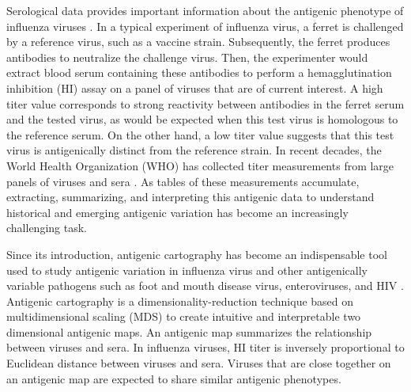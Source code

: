\documentclass[11pt,oneside,letterpaper]{article}
\begin{document}
Serological data provides important information about the antigenic phenotype of influenza viruses \cite{smith_mapping_2004}. 
In a typical experiment of influenza virus, a ferret is challenged by a reference virus, such as a vaccine strain.
Subsequently, the ferret produces antibodies to neutralize the challenge virus. 
Then, the experimenter would extract blood serum containing these antibodies to perform a hemagglutination inhibition (HI) assay  on a panel of viruses that are of current interest. 
A high titer value corresponds to strong reactivity between antibodies in the ferret serum and the tested virus, as would be expected when this test virus is homologous to the reference serum.
On the other hand, a low titer value suggests that this test virus is antigenically distinct from the reference strain. 
In recent decades, the World Health Organization (WHO) has collected titer measurements from large panels of viruses and sera \cite{smith_mapping_2004, russell_global_2008}. 
As tables of these measurements accumulate, extracting, summarizing, and interpreting this antigenic data to understand historical and emerging antigenic variation has become an increasingly challenging task. %

Since its introduction, antigenic cartography \cite{smith_mapping_2004, cai_computational_2010} has become an indispensable tool used to study antigenic variation in influenza virus and other antigenically variable pathogens such as foot and mouth disease virus, enteroviruses, and HIV \cite{smith_mapping_2004, jong_antigenic_2007, ludi_antigenic_2014, debbink_withinhost_2014, frost_mapping_2013}.
Antigenic cartography is a dimensionality-reduction technique based on multidimensional scaling (MDS) to create intuitive and interpretable two
dimensional antigenic maps. 
An antigenic map summarizes the relationship between viruses and sera.
In influenza viruses, HI titer is inversely proportional to Euclidean distance between viruses and sera.
Viruses that are close together on an antigenic map are expected to share similar antigenic phenotypes. 
\end{document}
